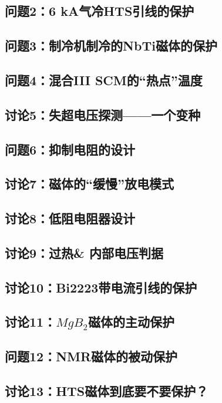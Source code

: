 \newpage
\subsection{问题2：6 kA气冷HTS引线的保护}

\newpage
\subsection{问题3：制冷机制冷的NbTi磁体的保护}

\newpage
\subsection{问题4：混合III SCM的“热点”温度}

\newpage
\subsection{讨论5：失超电压探测——一个变种}

\newpage
\subsection{问题6：抑制电阻的设计}

\newpage
\subsection{讨论7：磁体的“缓慢”放电模式}

\newpage
\subsection{讨论8：低阻电阻器设计}

\newpage
\subsection{讨论9：过热\& 内部电压判据}

\newpage
\subsection{讨论10：Bi2223带电流引线的保护}

\newpage
\subsection{讨论11：$MgB_2$磁体的主动保护}

\newpage
\subsection{问题12：NMR磁体的被动保护}

\newpage
\subsection{讨论13：HTS磁体到底要不要保护？}
